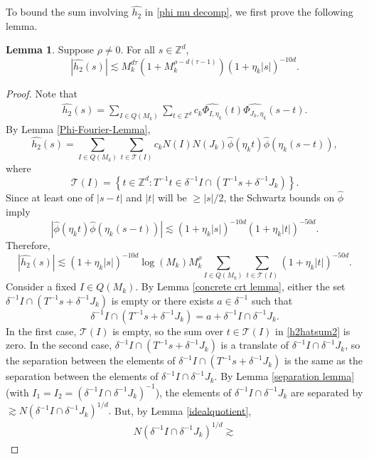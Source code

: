 \documentclass{amsart}
\numberwithin{equation}{section}
\theoremstyle{definition}
\newtheorem{lemma}[theorem]{Lemma}
\theoremstyle{definition}
\def\ZZ{\mathbb{Z}}
\newcommand{\cbr}[1]{ \left\{ {#1} \right\} }
\begin{document}
To bound the sum involving $\widehat{h_2}$ in \eqref{phi mu decomp}, we first prove the following lemma. 
%
\begin{lemma}\label{h_2_est}
Suppose $\rho \neq 0$. 
For all 
$s \in \ZZ^d$, 
$$
|\widehat{h_2}(s)| \lesssim  M_k^{d\tau} (1+ M_k^{\rho -d(\tau-1)})(1 + \eta_k |s|)^{-10d}.
$$
\end{lemma}
\begin{proof}
Note that
\begin{align*}
\widehat{h_2}(s) 
= \sum_{I \in Q(M_k)} \sum_{t \in \mathbb{Z}^d} 
c_k \widehat{\Phi_{I, \eta_k}}(t) \widehat{\Phi_{J_k, \eta_k}}(s - t).
\end{align*}
By Lemma \ref{Phi-Fourier-Lemma}, 
\[\widehat{h_2}(s) = \sum_{I \in Q(M_k)} \sum_{t \in \mathcal{T}(I)} 
c_k 
N(I) 
 N(J_k) 
 \widehat \phi(\eta_k t)
\widehat \phi(\eta_k(s - t)),\]
where 
$$
\mathcal{T}(I)
=
\cbr{t \in \ZZ^d : T^{-1}t \in \delta^{-1}I \cap (T^{-1}s + \delta^{-1}J_k)}.
$$
Since at least one of $|s - t|$ and $|t|$ will be $\geq |s|/2$, 
the Schwartz bounds on $\widehat{\phi}$ 
imply 
$$
|\widehat \phi(\eta_k t)
\widehat \phi(\eta_k(s - t))| 
\lesssim (1+\eta_k|s|)^{-10d}(1+\eta_k|t|)^{-50d}.
$$
Therefore,
\begin{equation}\label{h2hatsum2}
|\widehat{h_2}(s)| \lesssim 
(1 + \eta_k |s|)^{-10d} \log (M_k) M_k^{\rho} 
\sum_{I \in Q(M_k)} 
\sum_{t \in \mathcal{T}(I)} 
(1+\eta_k|t|)^{-50d}. 
\end{equation}
Consider a fixed $I \in Q(M_k)$. 
By Lemma \ref{concrete crt lemma},  either the set 
$\delta^{-1} I \cap (T^{-1} s + \delta^{-1} J_k)$ is empty or 
there exists $a \in \delta^{-1}$ such that 
$$
\delta^{-1} I \cap (T^{-1} s + \delta^{-1} J_k)
=
a + \delta^{-1} I \cap \delta^{-1}J_k. 
$$ 
In the first case, $\mathcal{T}(I)$ is empty, so the sum over $t \in \mathcal{T}(I)$ in \eqref{h2hatsum2} is zero. 
In the second case, 
$\delta^{-1} I \cap (T^{-1} s + \delta^{-1} J_k)$ is a translate of 
$\delta^{-1} I \cap \delta^{-1}J_k$, 
so the separation between the elements of $\delta^{-1} I \cap (T^{-1} s + \delta^{-1} J_k)$
 is the same as the separation between the elements of $\delta^{-1} I \cap \delta^{-1}J_k$. 
By Lemma \ref{separation lemma} (with $I_1 = I_2 = ( \delta^{-1} I \cap \delta^{-1}J_k )^{-1}$), the elements of $\delta^{-1} I \cap \delta^{-1}J_k$ are separated by 
$
\gtrsim 
N(\delta^{-1} I \cap \delta^{-1}J_k)^{1/d}.
$ 
But, by Lemma \ref{idealquotient}, 
\begin{align}\label{I Jk norm calc}
N(\delta^{-1} I \cap \delta^{-1}J_k)^{1/d}
\gtrsim  

\end{align}
\end{proof}
\end{document}
